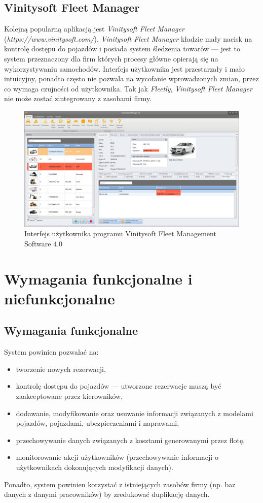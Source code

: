 \documentclass[eng,printmode,openany]{mgr}
\begin{document}
	\section{Vinitysoft Fleet Manager}
	Kolejną popularną aplikacją jest \textit{Vinitysoft Fleet Manager} (\textit{https://www.vinitysoft.com/}). \textit{Vinitysoft Fleet Manager} kładzie mały nacisk na kontrolę dostępu do pojazdów i posiada system śledzenia towarów — jest to system przeznaczony dla firm których procesy główne opierają się na wykorzystywaniu samochodów. Interfejs użytkownika jest przestarzały i mało intuicyjny, ponadto często nie pozwala na wycofanie wprowadzonych zmian, przez co wymaga czujności od użytkownika. Tak jak \textit{Fleetly}, \textit{Vinitysoft Fleet Manager} nie może zostać zintegrowany z zasobami firmy.
	\begin{figure}[H]
		\centering
		\includegraphics[width=\textwidth]{images/vinitysoft.png}
		\caption{Interfejs użytkownika programu Vinitysoft Fleet Management Software 4.0}
	\end{figure}
	\newpage
	\chapter{Wymagania funkcjonalne i niefunkcjonalne}
	\section{Wymagania funkcjonalne}
	System powinien pozwalać na:
	\begin{itemize}
		\item tworzenie nowych rezerwacji,
		\item kontrolę dostępu do pojazdów — utworzone rezerwacje muszą być zaakceptowane przez kierowników,
		\item dodawanie, modyfikowanie oraz usuwanie informacji związanych z modelami pojazdów, pojazdami, ubezpieczeniami i naprawami,
		\item przechowywanie danych związanych z kosztami generowanymi przez flotę,
		\item monitorowanie akcji użytkowników (przechowywanie informacji o użytkownikach dokonujących modyfikacji danych).
	\end{itemize}
	Ponadto, system powinien korzystać z istniejących zasobów firmy (np. baz danych z danymi pracowników) by zredukować duplikację danych.
	
\end{document}
